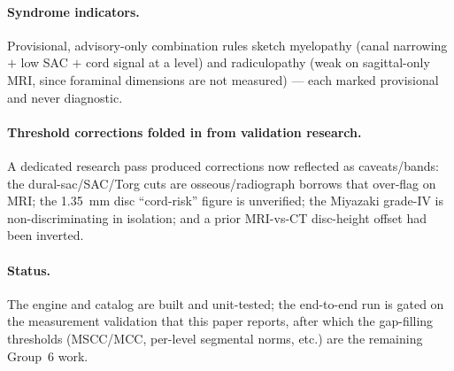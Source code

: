\paragraph{Syndrome indicators.} Provisional, advisory-only combination rules sketch myelopathy (canal
narrowing $+$ low SAC $+$ cord signal at a level) and radiculopathy (weak on sagittal-only MRI, since
foraminal dimensions are not measured) --- each marked provisional and never diagnostic.

\paragraph{Threshold corrections folded in from validation research.} A dedicated research pass produced
corrections now reflected as caveats/bands: the dural-sac/SAC/Torg cuts are osseous/radiograph borrows
that over-flag on MRI; the \SI{1.35}{\milli\meter} disc ``cord-risk'' figure is unverified; the Miyazaki
grade-IV is non-discriminating in isolation; and a prior MRI-vs-CT disc-height offset had been inverted.

\paragraph{Status.} The engine and catalog are built and unit-tested; the end-to-end run is gated on the
measurement validation that this paper reports, after which the gap-filling thresholds (MSCC/MCC,
per-level segmental norms, etc.) are the remaining Group~6 work.
